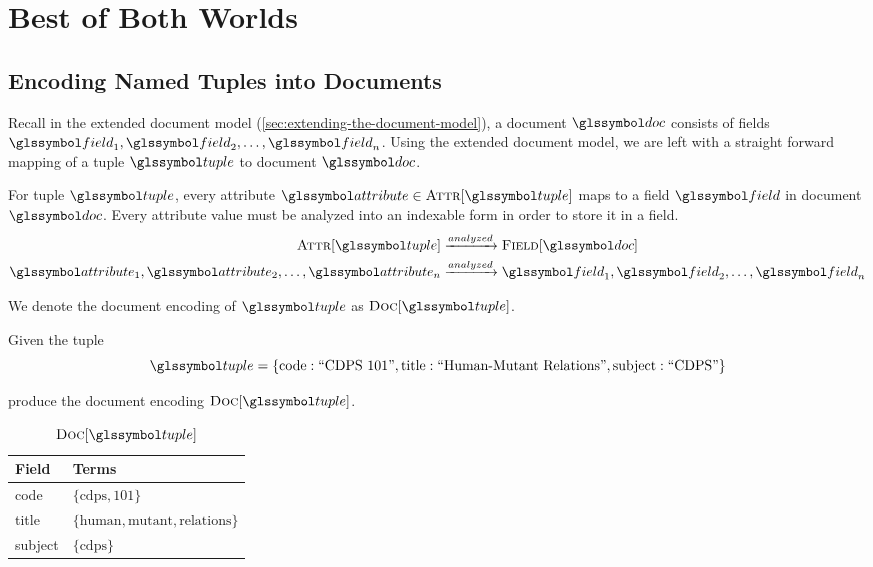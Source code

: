 \chapter{Best of Both Worlds}
\label{chap:best-of-both-worlds}
	
	\section{Encoding Named Tuples into Documents}
	\label{sec:named-tuples-documents}
		Recall in the extended document model (\vref{sec:extending-the-document-model}), a document \(\doc\) consists of fields \(\field_1, \field_2, \dotsc, \field_n\).  Using the extended document model, we are left with a straight forward mapping of a tuple \(\tuple\) to document \(\doc\).
		
		For tuple \(\tuple\), every attribute \(\attribute \in \attributes{\tuple}\) maps to a field \(\field\) in document \(\doc\).	Every attribute value must be analyzed into an indexable form in order to store it in a field.
		\begin{align}
			\attributes{\tuple} &\xrightarrow{analyzed} \fields{\doc} \\
			\attribute_1, \attribute_2, \dotsc, \attribute_n &\xrightarrow{analyzed} \field_1, \field_2, \dotsc, \field_n
		\end{align}
		
		We denote the document encoding of \(\tuple\) as \(\docs{\tuple}\).
		
		\begin{ex}
			Given the tuple
			\[
				\tuple = \{\text{code}: \text{``CDPS 101''}, \text{title}: \text{``Human-Mutant Relations''}, \text{subject}: \text{``CDPS''}\}
			\]
			
			produce the document encoding \(\docs{\tuple}\).
			
			\begin{table}
				\centering
				
				\begin{tabular}{ll}
					\toprule
					Field & Terms \\
					\midrule
					code & \(\{\text{cdps}, \text{101}\}\) \\
					title & \(\{\text{human}, \text{mutant}, \text{relations}\}\) \\
					subject & \(\{\text{cdps}\}\) \\
					\bottomrule
				\end{tabular}
				
				\caption{\(\docs{\tuple}\)}
			\end{table}
		\end{ex}

